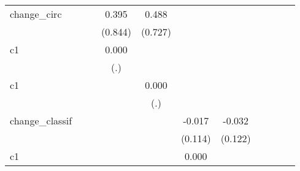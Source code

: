 {\begin{tabular}{l*{10}{c}}
\addlinespace
change\_circ         &                     &                     &       0.395         &       0.488         &                     &                     &                     &                     &                     &                     \\
                    &                     &                     &     (0.844)         &     (0.727)         &                     &                     &                     &                     &                     &                     \\
\addlinespace
c1                  &                     &                     &       0.000         &                     &                     &                     &                     &                     &                     &                     \\
                    &                     &                     &         (.)         &                     &                     &                     &                     &                     &                     &                     \\
\addlinespace
c1                  &                     &                     &                     &       0.000         &                     &                     &                     &                     &                     &                     \\
                    &                     &                     &                     &         (.)         &                     &                     &                     &                     &                     &                     \\
\addlinespace
change\_classif      &                     &                     &                     &                     &      -0.017         &      -0.032         &                     &                     &                     &                     \\
                    &                     &                     &                     &                     &     (0.114)         &     (0.122)         &                     &                     &                     &                     \\
\addlinespace
c1                  &                     &                     &                     &                     &       0.000         &                     &                     &                     &                     &                     \\

\end{tabular}}
